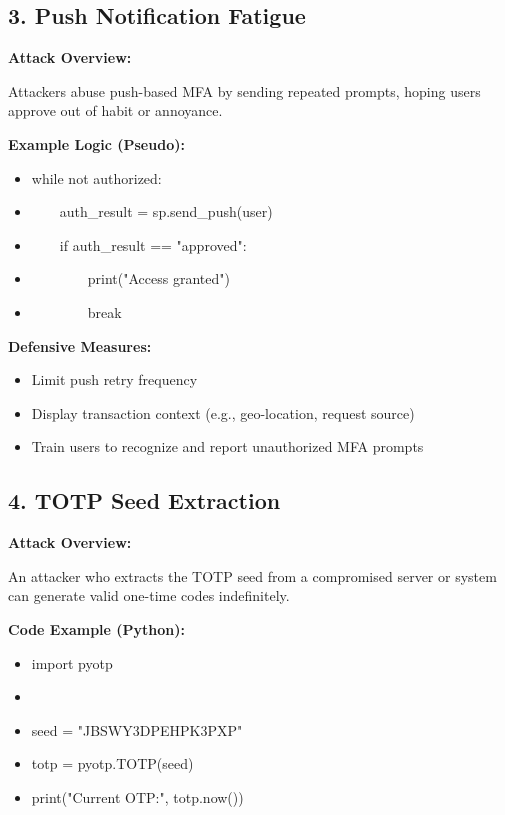 \subsection{\textbf{3. Push Notification Fatigue}}

\textbf{Attack Overview:}

Attackers abuse push-based MFA by sending repeated prompts, hoping users approve out of habit or annoyance.

\textbf{Example Logic (Pseudo):}

\begin{itemize}
    \item while not authorized:
    \item     auth\_result = sp.send\_push(user)
    \item     if auth\_result == "approved":
    \item         print("Access granted")
    \item         break
\end{itemize}

\textbf{Defensive Measures:}

\begin{itemize}
    \item Limit push retry frequency
    \item Display transaction context (e.g., geo-location, request source)
    \item Train users to recognize and report unauthorized MFA prompts

\end{itemize}

\subsection{\textbf{4. TOTP Seed Extraction}}

\textbf{Attack Overview:}

An attacker who extracts the TOTP seed from a compromised server or system can generate valid one-time codes indefinitely.

\textbf{Code Example (Python):}

\begin{itemize}
    \item import pyotp
    \item 

    \item seed = "JBSWY3DPEHPK3PXP"
    \item totp = pyotp.TOTP(seed)
    \item print("Current OTP:", totp.now())
\end{itemize}

